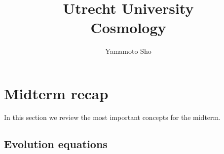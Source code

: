 \documentclass[a4paper, 12pt]{article}
\title{Utrecht University\\
        \large Cosmology\\}
\author{Yamamoto Sho}
\begin{document}
\maketitle
\tableofcontents

\section{Midterm recap}
\label{sec:Midterm recap}
  
In this section we review the most important concepts for the midterm. 

\subsection{Evolution equations}%
  \label{sub:{Evolution equations}
  

The Friedmann equations are, 
\begin{align}
  \label{friedmann equations}
    H^2(t) &= \frac{8\piG}{3} \rho  \\ 
    \frac{\ddot{a}}{a} &= - \frac{4\piG}{3}(\rho + 3P) 
\end{align}, where often we take \( P = \omega \rho \). 
We also couple these with the conservation of energy, 
\begin{align}
  \label{consevation of energy}
  a^{-3} \frac{\dd[]{(\rho a^{3} )}}{\dd[]{t}} = - 3
  H P 
\end{align}

\subsection{Components of the Universe}%
  \label{sub:Components of the Universe}

  \begin{enumerate}
    \item[\circ] matter: \( \rho_m  = \rho_{m, 0} a^{-3}  \) \\ 
    \item[\circ]  radiation: \rho_r = \rho_{r, 0} a^{-4} \\ 
    \item[\circ]  \rho_{\Lambda} = \frac{\Lambda}{ 8 \pi G } = -
    P_{\Lambda}
  \end{enumerate}
And the general expression for a perfect fluid is \( P = \omega \rho \), and
in the CPL parametrisation for DE: \( \omega(a) = \omega_0 +
\omega_{a}(1-a) \)

}
\end{document}
